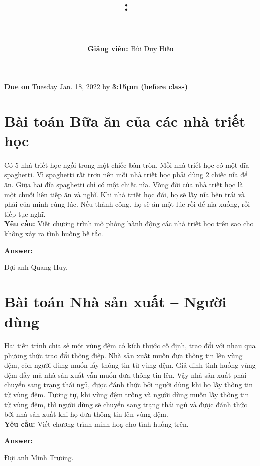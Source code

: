 \documentclass{article}
\title{
\vspace{-1in}
\textmd{\textbf{\hmwkClass:\ \hmwkTitle} \\ \hmwkAuthorName}\\ 
}
\author{\textbf{Giảng viên: } Bùi Duy Hiếu}
\date{}
\newenvironment{answer}{
    {\bf Answer:} \sf \begingroup\color{black}
}{\endgroup}%
\begin{document}
\maketitle
\vspace{-.4in}

\begin{center}
    \large{\textbf{Due on} Tuesday Jan. 18, 2022 by \textbf{3:15pm (before class)}}
\end{center}

\section{Bài toán Bữa ăn của các nhà triết học}
Có 5 nhà triết học ngồi trong một chiếc bàn tròn. Mỗi nhà triết học có một đĩa spaghetti. Vì spaghetti rất trơn nên mỗi nhà triết học phải dùng 2 chiếc nĩa để ăn. Giữa hai đĩa spaghetti chỉ có một chiếc nĩa. Vòng đời của nhà triết học là một chuỗi liên tiếp ăn và nghĩ. Khi nhà triết học đói, họ sẽ lấy nĩa bên trái và phải của minh cùng lúc. Nếu thành công, họ sẽ ăn một lúc rồi để nĩa xuống, rồi tiếp tục nghĩ. \\ 

\textbf{Yêu cầu: }Viết chương trình mô phỏng hành động các nhà triết học trên sao cho không xảy ra tình huống bế tắc.

\begin{shaded}
    \begin{answer}
        Đợi anh Quang Huy.
    \end{answer}
\end{shaded}

\section{Bài toán Nhà sản xuất – Người dùng}
Hai tiến trình chia sẻ một vùng đệm có kích thước cố định, trao đổi với nhau qua phương thức trao đổi thông điệp. Nhà sản xuất muốn đưa thông tin lên vùng đệm, còn người dùng muốn lấy thông tin từ vùng đệm.
Giả định tình huống vùng đệm đầy mà nhà sản xuất vẫn muốn đưa thông tin lên. Vậy nhà sản xuất phải chuyển sang trạng thái ngủ, được đánh thức bởi người dùng khi họ lấy thông tin từ vùng đệm. Tương tự, khi vùng đệm trống và người dùng muốn lấy thông tin từ vùng đệm, thì người dùng sẽ chuyển sang trạng thái ngủ và được đánh thức bởi nhà sản xuất khi họ đưa thông tin lên vùng đệm. \\ 

\textbf{Yêu cầu: }Viết chương trình minh hoạ cho tình huống trên.
\begin{shaded}
    \begin{answer}
        Đợi anh Minh Trương.
    \end{answer}
\end{shaded}
\end{document}
